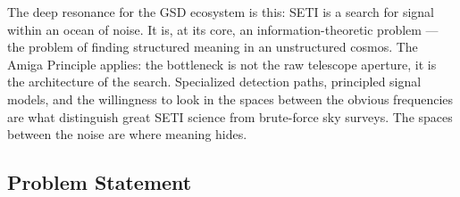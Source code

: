 \documentclass[11pt,letterpaper]{article}
\begin{document}
The deep resonance for the GSD ecosystem is this: SETI is a search for signal within an ocean of noise. It is, at its core, an information-theoretic problem --- the problem of finding structured meaning in an unstructured cosmos. The Amiga Principle applies: the bottleneck is not the raw telescope aperture, it is the architecture of the search. Specialized detection paths, principled signal models, and the willingness to look in the spaces between the obvious frequencies are what distinguish great SETI science from brute-force sky surveys. The spaces between the noise are where meaning hides.

\subsection{Problem Statement}
\end{document}
